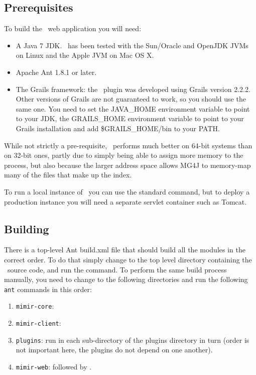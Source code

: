 \subsection{Prerequisites}

To build the \Mimir\ web application you will need:
\begin{itemize}
\item A Java 7 JDK.  \Mimir\ has been tested with the Sun/Oracle and OpenJDK
  JVMs on Linux and the Apple JVM on Mac OS X.
\item Apache Ant 1.8.1 or later.
\item The Grails framework:  the \Mimir\ plugin was developed using Grails
  version 2.2.2. Other versions of Grails are not guaranteed to work, so you
  should use the same one. You need to set the JAVA\_HOME environment variable
  to  point to your JDK, the GRAILS\_HOME environment variable to point to your
  Grails installation and add \$GRAILS\_HOME/bin to your PATH.
\end{itemize}

While not strictly a pre-requisite, \Mimir\ performs much better on 64-bit
systems than on 32-bit ones, partly due to simply being able to assign more
memory to the process, but also because the larger address space allows MG4J to
memory-map many of the files that make up the index.

To run a local instance of \Mimir\ you can use the standard  command, but to deploy a production instance you will need a separate
servlet container such as Tomcat.

\subsection{Building}

There is a top-level Ant build.xml file that should build all the modules in
the correct order. To do that simply change to the top level directory
containing the \Mimir\ source code, and run the  command. To perform
the same build process manually, you need to change to the following directories
and run the following {\tt ant} commands in this order:
\begin{enumerate}
\item {\tt mimir-core}: 
\item {\tt mimir-client}: 
\item {\tt plugins}: run  in each sub-directory of the plugins
  directory in turn (order is not important here, the plugins do not depend on
  one another).
\item {\tt mimir-web}:  followed by .
\end{enumerate}

